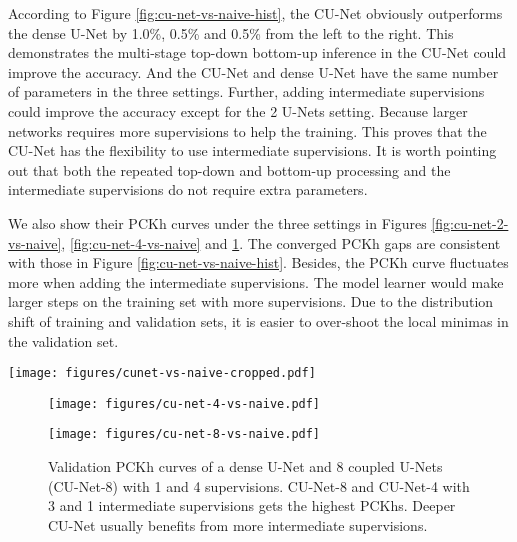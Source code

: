 \documentclass{bmvc2k}
\begin{document}
According to Figure \ref{fig:cu-net-vs-naive-hist}, the CU-Net obviously outperforms the dense U-Net by 1.0\%, 0.5\% and 0.5\% from the left to the right. This demonstrates the multi-stage top-down bottom-up inference in the CU-Net could improve the accuracy. And the CU-Net and dense U-Net have the same number of parameters in the three settings. Further, adding intermediate supervisions could improve the accuracy except for the 2 U-Nets setting. Because larger networks requires more supervisions to help the training. This proves that the CU-Net has the flexibility to use intermediate supervisions. It is worth pointing out that both the repeated top-down and bottom-up processing and the intermediate supervisions do not require extra parameters.

We also show their PCKh curves under the three settings in Figures \ref{fig:cu-net-2-vs-naive}, \ref{fig:cu-net-4-vs-naive} and \ref{fig:cu-net-8-vs-naive}. The converged PCKh gaps are consistent with those in Figure \ref{fig:cu-net-vs-naive-hist}. Besides, the PCKh curve fluctuates more when adding the intermediate supervisions. The model learner would make larger steps on the training set with more supervisions. Due to the distribution shift of training and validation sets, it is easier to over-shoot the local minimas in the validation set.

\begin{figure*}[t!]
\centering
  \texttt{[image: figures/cunet-vs-naive-cropped.pdf]}
\caption{CU-Net {\it v.s.} naive dense U-Net measured by the PCKh on the MPII validation set. In the three comparisons, the CU-Net has 2, 4 and 8 U-Nets. The naive dense U-Net is a single U-Net with equivalent sizes. The CU-Net outperforms the dense U-Net obviously. Adding intermediate supervisions could help further improve the PCKh for deep CU-Net.}
\label{fig:cu-net-vs-naive-hist}
\end{figure*}

\begin{figure}[th]
\centering
  \texttt{[image: figures/cu-net-4-vs-naive.pdf]}
\caption{Validation PCKh curves of a dense U-Net and 4 coupled U-Nets (CU-Net-4) with 1 and 2 supervisions. There are clear gaps between the three converged curves. The intermediate supervision makes the curve fluctuate more from about 30 to 90 training epochs.}
\label{fig:cu-net-4-vs-naive}
\endminipage \hfill
{}
\centering
  \texttt{[image: figures/cu-net-8-vs-naive.pdf]}
\caption{Validation PCKh curves of a dense U-Net and 8 coupled U-Nets (CU-Net-8) with 1 and 4 supervisions. CU-Net-8 and CU-Net-4 with 3 and 1 intermediate supervisions gets the highest PCKhs. Deeper CU-Net usually benefits from more intermediate supervisions. }
  \label{fig:cu-net-8-vs-naive} \hfill
\endminipage
\vspace{-10pt}
\end{figure}
\end{document}
